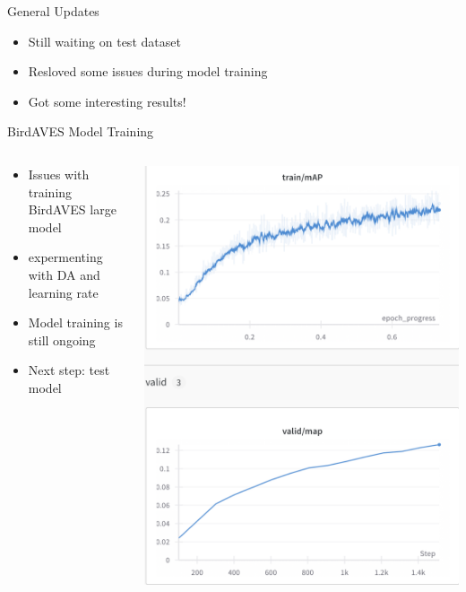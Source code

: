 \begin{frame}{General Updates}
    \begin{itemize}
        \item Still waiting on test dataset
        \item Resloved some issues during model training
        \item Got some interesting results!
    \end{itemize}    
\end{frame}

\begin{frame}{BirdAVES Model Training}
    \begin{columns}
        \begin{column}{0.5\textwidth}
        \begin{itemize}
        \item Issues with training BirdAVES large model
        \item expermenting with DA and learning rate
        \item Model training is still ongoing
        \item Next step: test model
        \end{itemize}
    \end{column}
    \begin{column}{0.5\textwidth}
        \centering
        \includegraphics[height=0.85\textheight,width=1\textwidth,keepaspectratio]{images/BirdAVES_cmap.png} 
    \end{column}   
    \end{columns}
\end{frame}
